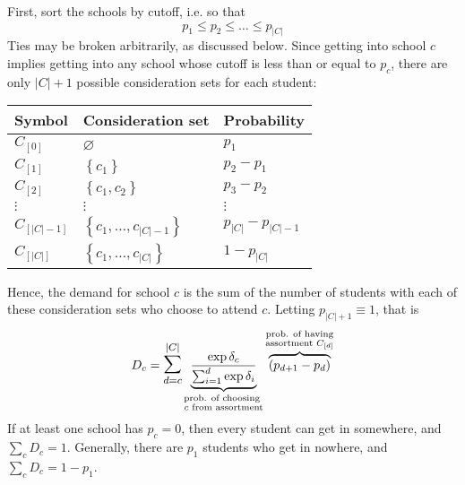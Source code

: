 \documentclass[12pt]{article}
\theoremstyle{definition}
\begin{document}
First, sort the schools by cutoff, i.e. so that
\[p_1 \leq p_2 \leq \dots \leq p_{|C|}\]
Ties may be broken arbitrarily, as discussed below. Since getting into school $c$ implies getting into any school whose cutoff is less than or equal to $p_c$, there are only $|C| + 1$ possible consideration sets for each student: 
\begin{center}
\begin{tabular}{lll}
\textbf{Symbol} & \textbf{Consideration set} & \textbf{Probability} \\ \hline
$C_{[0]}$    & $\varnothing$    & $p_1$                  \\
$C_{[1]}$    & $\left\{ c_1 \right\}$    & $p_2 - p_1$               \\
$C_{[2]}$    & $\left\{ c_1, c_2 \right\}$    & $p_3 - p_2$               \\
$\vdots$ & $\vdots$ & $\vdots$ \\
$C_{[|C| - 1]}$           & $\left\{ c_1, \dots, c_{|C| - 1} \right\}$     & $p_{|C|} - p_{|C|-1}$             \\
$C_{[|C|]}$           & $\left\{ c_1, \dots, c_{|C|} \right\}$     & $1 - p_{|C|}$                 
\end{tabular}
\end{center}
Hence, the demand for school $c$ is the sum of the number of students with each of these consideration sets who choose to attend $c$. Letting $p_{|C|+1} \equiv 1$, that is
\begin{equation}D_c = \mathlarger{\mathlarger{\sum}}_{d=c}^{|C|} 
\underbrace{\frac{\exp{\delta_c}}{ \sum_{i=1}^d \exp{\delta_i}}}_{\substack{\text{prob. of choosing  }\\ c\text{ from assortment}}} 
\overbrace{\left(p_{d+1} - p_{d}\right)}^{\substack{\text{prob. of having}\\ \text{assortment }C_{[d]}}} 
\label{mnlonetestdemand}\end{equation}
If at least one school has $p_c = 0$, then every student can get in somewhere, and $\sum_c D_c = 1$. Generally, there are $p_1$ students who get in nowhere, and $\sum_c D_c = 1 - p_1$.
\end{document}
